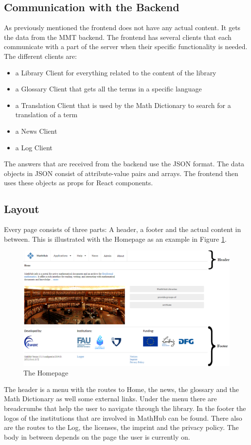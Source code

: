 \documentclass[11pt,a4paper]{article}
\begin{document}
\subsection{Communication with the Backend}
As previously mentioned the frontend does not have any actual content.
It gets the data from the MMT backend.
The frontend has several clients that each communicate with a part of the server when their specific functionality is needed.
The different clients are:
\begin{itemize}
\item a Library Client for everything related to the content of the library
\item a Glossary Client that gets all the terms in a specific language
\item a Translation Client that is used by the Math Dictionary to search for a translation of a term 
\item a News Client
\item a Log Client
\end{itemize}
The answers that are received from the backend use the JSON format.
The data objects in JSON consist of attribute-value pairs and arrays.
The frontend then uses these objects as props for React components.

\subsection{Layout}
Every page consists of three parts: A header, a footer and the actual content in between.
This is illustrated with the Homepage as an example in Figure \ref{fig:home}.
\begin{figure}[H]
\includegraphics[width=1\textwidth]{home2.png}
\caption{The Homepage}
\label{fig:home}
\end{figure}
The header is a menu with the routes to Home, the news, the glossary and the Math Dictionary as well some external links.
Under the menu there are breadcrumbs that help the user to navigate through the library.
In the footer the logos of the institutions that are involved in MathHub can be found.
There also are the routes to the Log, the licenses, the imprint and the privacy policy.
The body in between depends on the page the user is currently on.
\end{document}
